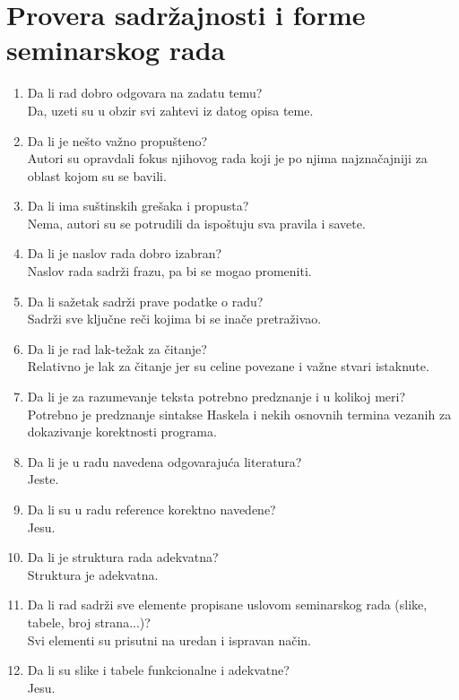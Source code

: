 \documentclass[a4paper]{report}
\begin{document}
\section{Provera sadržajnosti i forme seminarskog rada}

\begin{enumerate}
\item Da li rad dobro odgovara na zadatu temu?\\ Da, uzeti su u obzir svi zahtevi iz datog opisa teme. 
\item Da li je nešto važno propušteno?\\ Autori su opravdali fokus njihovog rada koji je po njima najznačajniji za oblast kojom su se bavili.
\item Da li ima suštinskih grešaka i propusta?\\ Nema, autori su se potrudili da ispoštuju sva pravila i savete.
\item Da li je naslov rada dobro izabran?\\ Naslov rada sadrži frazu, pa bi se mogao promeniti.
\item Da li sažetak sadrži prave podatke o radu?\\ Sadrži sve ključne reči kojima bi se inače pretraživao.
\item Da li je rad lak-težak za čitanje?\\ Relativno je lak za čitanje jer su celine povezane i važne stvari istaknute.
\item Da li je za razumevanje teksta potrebno predznanje i u kolikoj meri?\\ Potrebno je predznanje sintakse Haskela i nekih osnovnih termina vezanih za dokazivanje korektnosti programa.
\item Da li je u radu navedena odgovarajuća literatura?\\ Jeste.
\item Da li su u radu reference korektno navedene?\\ Jesu.
\item Da li je struktura rada adekvatna?\\ Struktura je adekvatna.
\item Da li rad sadrži sve elemente propisane uslovom seminarskog rada (slike, tabele, broj strana...)?\\ Svi elementi su prisutni na uredan i ispravan način.
\item Da li su slike i tabele funkcionalne i adekvatne?\\ Jesu.
\end{enumerate}
\end{document}
